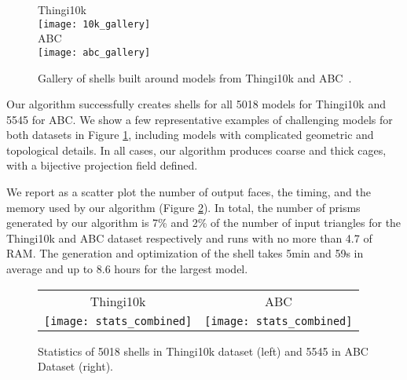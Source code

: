 
\begin{figure}
    \centering
    Thingi10k\\
    \texttt{[image: 10k\_gallery]}\\%
    ABC\\
    \texttt{[image: abc\_gallery]}
    \caption{Gallery of shells built around models from Thingi10k \protect\cite{zhou2016thingi10k} and ABC~\protect\cite{Koch_2019_CVPR}.}
    \label{fig:gallery}
    
\end{figure}


Our algorithm successfully creates shells for all 5018 models for Thingi10k and 5545 for ABC. 
We show a few representative examples of challenging models for both datasets in Figure \ref{fig:gallery}, including models with complicated geometric and topological details. In all cases, our algorithm produces coarse and thick cages, with a bijective projection field defined.

We report as a scatter plot the number of output faces, the timing, and the memory used by our algorithm (Figure \ref{fig:large-dataset}).
In total, the number of prisms generated by our algorithm is 7\% and 2\% of the number of input triangles for the Thingi10k and ABC dataset respectively 
and runs with no more than 4.7  of RAM. 
The generation and optimization of the shell takes 5min and 59s in average and up to 8.6 hours for the largest model. 

%     
\begin{figure}
    \centering
    \begin{tabular}{cc}
        Thingi10k & ABC \\ 
        \texttt{[image: stats\_combined]}
        &\texttt{[image: stats\_combined]}
    \end{tabular}
    \caption{Statistics of 5018 shells in Thingi10k dataset \cite{zhou2016thingi10k} (left) and 5545 in ABC Dataset \cite{Koch_2019_CVPR} (right).}
    \label{fig:large-dataset}
    
\end{figure}


